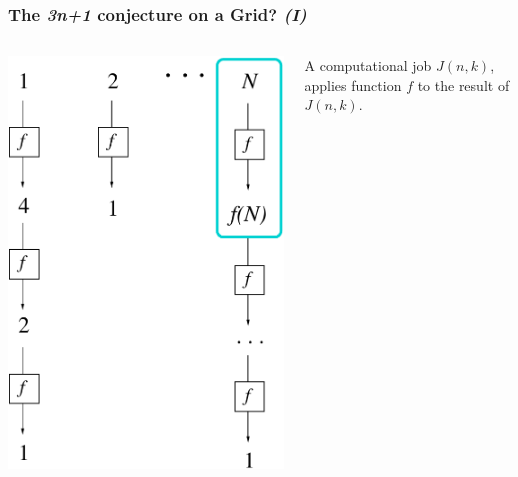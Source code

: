\documentclass[presentation]{beamer}
\newcommand{\largeskip}{\vspace{1em}}
\def\+{\largeskip}
\begin{document}
  \begin{frame}
    \frametitle{The \emph{3n+1} conjecture on a Grid? \emph{(I)}}
    \label{sec:7}

    \+
    \begin{columns}[c]
      \includegraphics[height=0.8\textheight]{3n+1_A}
      
      A computational job $J(n,k)$, applies
      function $f$ to the result of $J(n,k)$.
    \end{columns}
  \end{frame}
\end{document}
